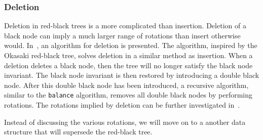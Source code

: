 \subsubsection{Deletion}
Deletion in red-black trees is a more complicated than insertion.
Deletion of a black node can imply a much larger range of rotations than insert otherwise would.
In~\cite{germane2014deletion}, an algorithm for deletion is presented.
The algorithm, inspired by the Okasaki red-black tree, solves deletion in a similar method as insertion.
When a deletion deletes a black node, then the tree will no longer satisfy the black node invariant.
The black node invariant is then restored by introducing a double black node.
After this double black node has been introduced, a recursive algorithm, similar to the \texttt{balance} algorithm, removes all double black nodes by performing rotations.
The rotations implied by deletion can be further investigated in~\cite{germane2014deletion}.

Instead of discussing the various rotations, we will move on to a another data structure that will supersede the red-black tree.

